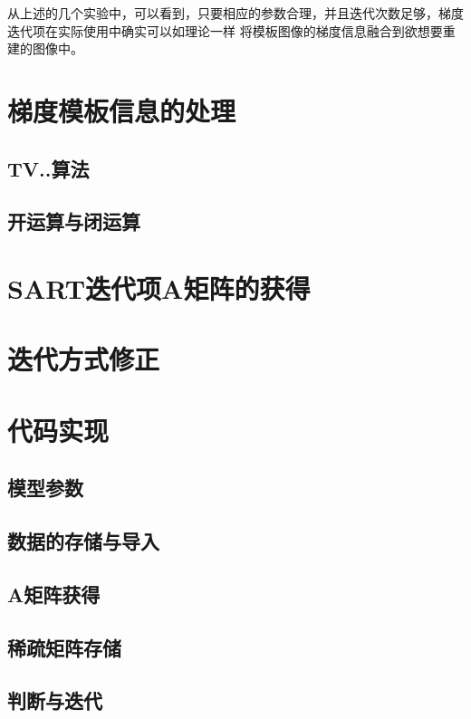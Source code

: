 从上述的几个实验中，可以看到，只要相应的参数合理，并且迭代次数足够，梯度迭代项在实际使用中确实可以如理论一样
将模板图像的梯度信息融合到欲想要重建的图像中。

\section{梯度模板信息的处理}
\subsection{TV..算法}
\subsection{开运算与闭运算}

\section{SART迭代项A矩阵的获得}

\section{迭代方式修正}

\section{代码实现}
\subsection{模型参数}
\subsection{数据的存储与导入}
\subsection{A矩阵获得}
\subsection{稀疏矩阵存储}
\subsection{判断与迭代}





